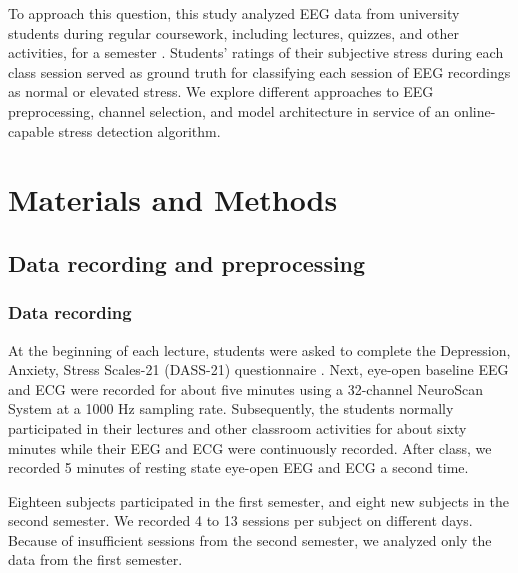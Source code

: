 \documentclass[journal]{IEEEtran}
\begin{document}
To approach this question, this study analyzed EEG data from university students during regular coursework, including lectures, quizzes, and other activities, for a semester   \cite{ko2017classroom_data}. Students' ratings of their subjective stress during each class session served as ground truth for classifying each session of EEG recordings as normal or elevated stress. We explore different approaches to EEG preprocessing, channel selection, and model architecture in service of an online-capable stress detection algorithm.  



\section{Materials and Methods}
\subsection{Data recording and preprocessing}
\subsubsection{Data recording}
At the beginning of each lecture, students were asked to complete the Depression, Anxiety, Stress Scales-21 (DASS-21) questionnaire \cite{lovibond1995_dass21}.
Next, eye-open baseline EEG and ECG were recorded for about five minutes using a 32-channel NeuroScan System at a 1000 Hz sampling rate. Subsequently, the students normally participated in their lectures and other classroom activities for about sixty minutes while their EEG and ECG were continuously recorded. After class, we recorded 5 minutes of resting state eye-open EEG and ECG a second time.
\par
Eighteen subjects participated in the first semester, and eight new subjects in the second semester.
We recorded 4 to 13 sessions per subject on different days.
Because of insufficient sessions from the second semester, we analyzed only the data from the first semester.
\end{document}
